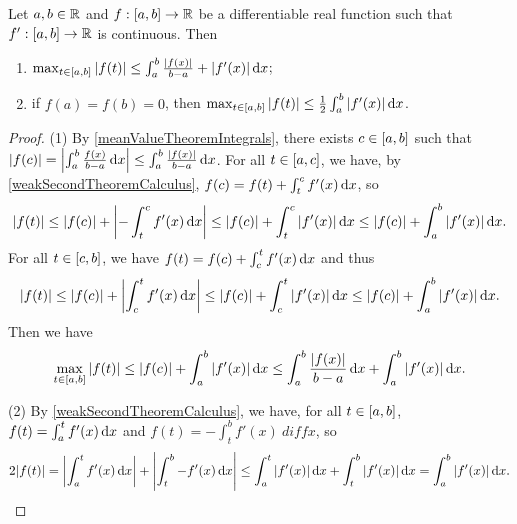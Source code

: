 \begin{lemma}
Let $a,b\in \mathbb{R}$ and $f:\interval{a,b}\to \R$ be a differentiable real function such that $f': \interval{a,b}\to \R$ is continuous. Then
\begin{enumerate}
\item $\max_{t\in \interval{a,b}}|f(t)| \leq \int_a^b \frac{|f(x)|}{b-a} + |f'(x)| \diff{x}$;
\item if $f(a) = f(b) = 0$, then $\max_{t\in \interval{a,b}}|f(t)| \leq \frac{1}{2}\int_a^b|f'(x)|\diff{x}$.
\end{enumerate}
\end{lemma}
\begin{proof}
(1) By \ref{meanValueTheoremIntegrals}, there exists $c\in \interval{a,b}$ such that $|f(c)| = \left|\int_a^b\frac{f(x)}{b-a}\operatorname{d \!}{x}\right| \leq \int_a^b\frac{|f(x)|}{b-a}\operatorname{d \!}{x}$.
For all $t\in \interval{a,c}$, we have, by \ref{weakSecondTheoremCalculus}, $f(c) = f(t) + \int_t^c f'(x)\operatorname{d \!}{x}$, so
\[ |f(t)| \leq |f(c)| + \left|-\int_t^c f'(x) \operatorname{d \!}{x}\right| \leq |f(c)| + \int_t^c |f'(x)|\operatorname{d \!}{x} \leq |f(c)| + \int_a^b |f'(x)|\operatorname{d \!}{x}. \]
For all $t\in \interval{c,b}$, we have $f(t) = f(c) + \int_c^t f'(x)\operatorname{d \!}{x}$ and thus
\[ |f(t)| \leq |f(c)| + \left|\int_c^t f'(x) \operatorname{d \!}{x}\right| \leq |f(c)| + \int_c^t |f'(x)|\operatorname{d \!}{x} \leq |f(c)| + \int_a^b |f'(x)|\operatorname{d \!}{x}. \]
Then we have
\[ \max_{t\in \interval{a,b}}|f(t)| \leq |f(c)| + \int_a^b |f'(x)|\diff{x} \leq \int_a^b\frac{|f(x)|}{b-a}\diff{x} + \int_a^b |f'(x)|\diff{x}. \]

(2) By \ref{weakSecondTheoremCalculus}, we have, for all $t\in \interval{a,b}$, $f(t) = \int_a^t f'(x) \operatorname{d \!}{x}$ and $f(t) = -\int_t^b f'(x)\ diff{x}$, so
\[ 2|f(t)| = \left|\int_a^t f'(x) \operatorname{d \!}{x}\right| + \left|\int_t^b -f'(x) \operatorname{d \!}{x}\right| \leq \int_a^t|f'(x)|\operatorname{d \!}{x} + \int_t^b |f'(x)|\operatorname{d \!}{x} = \int_a^b |f'(x)|\operatorname{d \!}{x}. \]
\end{proof}

